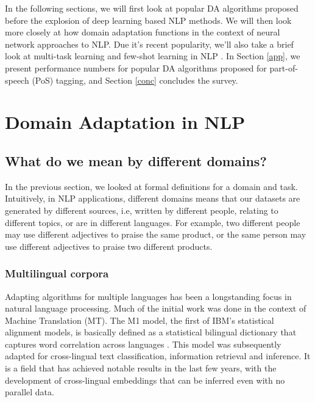 \documentclass[12pt]{report}
\begin{document}
	\par In the following sections, we will first look at popular DA algorithms proposed before the explosion of deep learning based NLP methods. We will  then look more closely at how domain adaptation functions in the context of neural network approaches to NLP. Due it's recent popularity, we'll also take a brief look at multi-task learning \citep{changpinyo2018multi} and few-shot learning in NLP \citep{srivastava2018zero}. In Section \ref{app}, we present performance numbers for popular DA algorithms proposed for part-of-speech (PoS) tagging, and Section \ref{conc} concludes the survey.
	
	\section{Domain Adaptation in NLP}
	\subsection{What do we mean by different domains?}
		In the previous section, we looked at formal definitions for a domain and task. Intuitively, in NLP applications, different domains means that our datasets are generated by different sources, i.e, written by different people, relating to different topics, or are in different languages. For example, two different people may use different adjectives to praise the same product, or the same person may use different adjectives to praise two different products. 
		
	\subsubsection{Multilingual corpora } 
	Adapting algorithms for multiple languages has been a longstanding focus in natural language processing. Much of the initial work was done in the context of Machine Translation (MT). The M1 model, the first of IBM’s statistical alignment models, is basically defined as a statistical bilingual dictionary that captures word correlation across languages \citep{pinto2009statistical}. This model was subsequently adapted for cross-lingual text classification, information retrieval and inference. It is a field that has achieved notable results in the last few years, with the development of cross-lingual embeddings that can be inferred even with no parallel data. 
	
\end{document}
